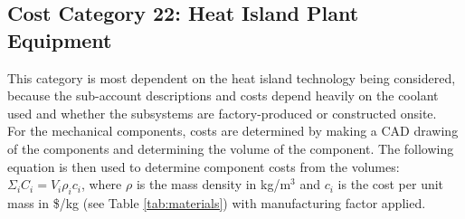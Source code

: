 
\subsection{Cost Category 22: Heat Island Plant Equipment}

This category is most dependent on the heat island technology being considered, because the sub-account descriptions and costs depend heavily on the coolant used and whether the subsystems are factory-produced or constructed onsite. \\

For the mechanical components, costs are determined by making a CAD drawing of the components  and determining the volume of the component.  The following equation is then used to determine 
component costs from the volumes: $\Sigma_{i} C_{i} = V_{i}  \rho_{i}c_{i}$, where $\rho$ is  the mass density in kg/m$^{3}$ and $c_{i}$ is the cost per unit mass in \$/kg (see Table \ref{tab:materials})  with manufacturing factor applied.

\begin{table}[h!]
\centering
{}
\caption{Properties of materials used in fusion reactors.}
\label{tab:materials}
\end{table}

